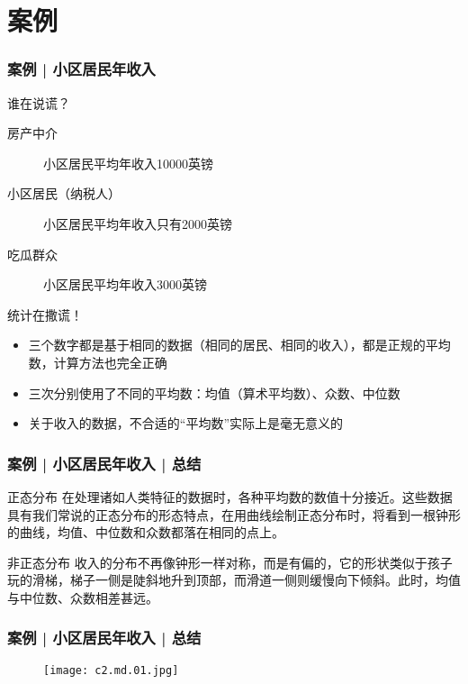 \section{案例}
\begin{frame}
  \frametitle{案例 | 小区居民年收入}
  \begin{block}{谁在说谎？}
    \begin{description}
      \item[房产中介] 小区居民平均年收入10000英镑
      \item[小区居民（纳税人）] 小区居民平均年收入只有2000英镑
      \item[吃瓜群众] 小区居民平均年收入3000英镑
    \end{description}
  \end{block}
  \pause
  \begin{block}{统计在撒谎！}
    \begin{itemize}
      \item 三个数字都是基于相同的数据（相同的居民、相同的收入），都是正规的平均数，计算方法也完全正确
      \item 三次分别使用了不同的平均数：均值（算术平均数）、众数、中位数
      \item 关于收入的数据，不合适的“平均数”实际上是毫无意义的
    \end{itemize}
  \end{block}
\end{frame}

\begin{frame}
  \frametitle{案例 | 小区居民年收入 | 总结}
  \begin{block}{正态分布}
在处理诸如人类特征的数据时，各种平均数的数值十分接近。这些数据具有我们常说的正态分布的形态特点，在用曲线绘制正态分布时，将看到一根钟形的曲线，均值、中位数和众数都落在相同的点上。
  \end{block}
  \pause
  \begin{block}{非正态分布}
收入的分布不再像钟形一样对称，而是有偏的，它的形状类似于孩子玩的滑梯，梯子一侧是陡斜地升到顶部，而滑道一侧则缓慢向下倾斜。此时，均值与中位数、众数相差甚远。
  \end{block}
\end{frame}

\begin{frame}
  \frametitle{案例 | 小区居民年收入 | 总结}
  \begin{figure}
    \centering
    \texttt{[image: c2.md.01.jpg]}
  \end{figure}
\end{frame}

